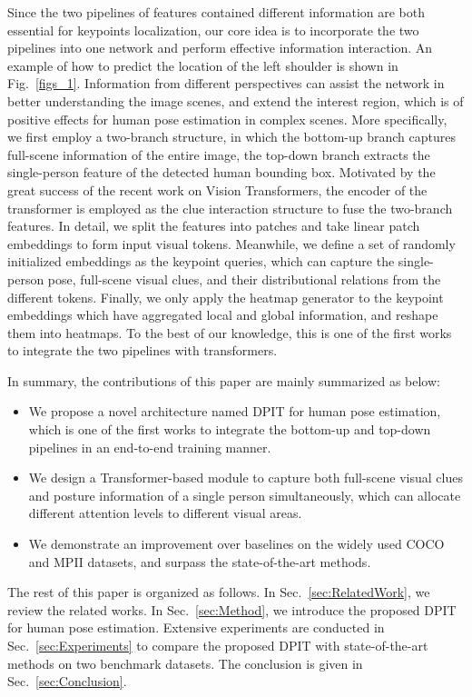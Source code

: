 \documentclass[runningheads]{llncs}
\begin{document}
Since the two pipelines of features contained different information are both essential for keypoints localization, our core idea is to incorporate the two pipelines into one network and perform effective information interaction. An example of how to predict the location of the left shoulder is shown in Fig.~\ref{figs_1}. Information from different perspectives can assist the network in better understanding the image scenes, and extend the interest region, which is of positive effects for human pose estimation in complex scenes.
More specifically, we first employ a two-branch structure, in which the bottom-up branch captures full-scene information of the entire image, the top-down branch extracts the single-person feature of the detected human bounding box. Motivated by the great success of the recent work on Vision Transformers, the encoder of the transformer is employed as the clue interaction structure to fuse the two-branch features. In detail, we split the features into patches and take linear patch embeddings to form input visual tokens. Meanwhile, we define a set of randomly initialized embeddings as the keypoint queries, which can capture the single-person pose, full-scene visual clues, and their distributional relations from the different tokens. Finally, we only apply the heatmap generator to the keypoint embeddings which have aggregated local and global information, and reshape them into heatmaps. To the best of our knowledge, this is one of the first works to integrate the two pipelines with transformers.

In summary, the contributions of this paper are mainly summarized as below:
\begin{itemize}
    \item We propose a novel architecture named DPIT for human pose estimation, which is one of the first works to integrate the bottom-up and top-down pipelines in an end-to-end training manner.
    \item We design a Transformer-based module to capture both full-scene visual clues and posture information of a single person simultaneously, which can allocate different attention levels to different visual areas.
    \item We demonstrate an improvement over baselines on the widely used COCO and MPII datasets, and surpass the state-of-the-art methods.
\end{itemize}

The rest of this paper is organized as follows. In Sec.~\ref{sec:RelatedWork}, we review the related works. In Sec.~\ref{sec:Method}, we introduce the proposed DPIT for human pose estimation. Extensive experiments are conducted in Sec.~\ref{sec:Experiments} to compare the proposed DPIT with state-of-the-art methods on two benchmark datasets. The conclusion is given in Sec.~\ref{sec:Conclusion}. 
\end{document}
